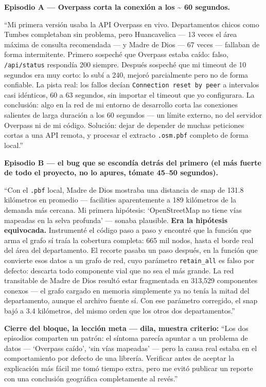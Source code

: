 \documentclass[11pt]{article}
\begin{document}
\begin{decirbox}
\textbf{Episodio A --- Overpass corta la conexión a los \textasciitilde
60 segundos.}

``Mi primera versión usaba la API Overpass en vivo. Departamentos chicos
como Tumbes completaban sin problema, pero Huancavelica --- 13 veces el
área máxima de consulta recomendada --- y Madre de Dios --- 67 veces ---
fallaban de forma intermitente. Primero sospeché que Overpass estaba
caído: falso, \texttt{/api/status} respondía 200 siempre. Después
sospeché que mi timeout de 10 segundos era muy corto: lo subí a 240,
mejoró parcialmente pero no de forma confiable. La pista real: los
fallos decían \texttt{Connection reset by peer} a intervalos casi
idénticos, 60 a 63 segundos, sin importar el timeout que yo configurara.
La conclusión: algo en la red de mi entorno de desarrollo corta las
conexiones salientes de larga duración a los 60 segundos --- un límite
externo, no del servidor Overpass ni de mi código. Solución: dejar de
depender de muchas peticiones cortas a una API remota, y procesar el
extracto \texttt{.osm.pbf} completo de forma local.''

\textbf{Episodio B --- el bug que se escondía detrás del primero (el más
fuerte de todo el proyecto, no lo apures, tómate 45--50 segundos).}

``Con el \texttt{.pbf} local, Madre de Dios mostraba una distancia de
snap de 131.8 kilómetros en promedio --- facilities aparentemente a 189
kilómetros de la demanda más cercana. Mi primera hipótesis: `OpenStreetMap
no tiene vías mapeadas en la selva profunda' --- sonaba plausible.
\textbf{Era la hipótesis equivocada.} Instrumenté el código paso a paso y
encontré que la función que arma el grafo sí traía la cobertura
completa: 665 mil nodos, hasta el borde real del área del departamento.
El recorte pasaba un paso después, en la función que convierte esos
datos a un grafo de red, cuyo parámetro \texttt{retain\_all} es falso por
defecto: descarta todo componente vial que no sea el más grande. La red
transitable de Madre de Dios resultó estar fragmentada en 313,529
componentes conexos --- el grafo cargado en memoria simplemente ya no
tenía la mitad del departamento, aunque el archivo fuente sí. Con ese
parámetro corregido, el snap bajó a 3.4 kilómetros, del mismo orden que
los otros dos departamentos.''

\textbf{Cierre del bloque, la lección meta --- dila, muestra criterio:}
``Los dos episodios comparten un patrón: el síntoma parecía apuntar a un
problema de datos --- `Overpass caído', `sin vías mapeadas' --- pero la
causa real estaba en el comportamiento por defecto de una librería.
Verificar antes de aceptar la explicación más fácil me tomó tiempo
extra, pero me evitó publicar un reporte con una conclusión geográfica
completamente al revés.''
\end{decirbox}
\end{document}
